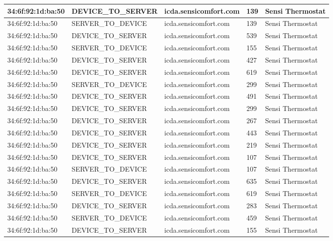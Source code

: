 \begin{table*}[t!]
\begin{tabularx}{\textwidth}{p{3cm} p{4cm} p{4cm} p{2cm} p{2cm}}
34:6f:92:1d:ba:50 &	DEVICE\_TO\_SERVER &	icda.sensicomfort.com &	139	 & Sensi Thermostat \\ \hline
34:6f:92:1d:ba:50 &	SERVER\_TO\_DEVICE &	icda.sensicomfort.com &	139	 & Sensi Thermostat \\ \hline
34:6f:92:1d:ba:50 &	DEVICE\_TO\_SERVER &	icda.sensicomfort.com &	539	 & Sensi Thermostat \\ \hline
34:6f:92:1d:ba:50 &	SERVER\_TO\_DEVICE &	icda.sensicomfort.com &	155	 & Sensi Thermostat \\ \hline
34:6f:92:1d:ba:50 &	DEVICE\_TO\_SERVER &	icda.sensicomfort.com &	427	 & Sensi Thermostat \\ \hline
34:6f:92:1d:ba:50 &	DEVICE\_TO\_SERVER &	icda.sensicomfort.com &	619	 & Sensi Thermostat \\ \hline
34:6f:92:1d:ba:50 &	SERVER\_TO\_DEVICE &	icda.sensicomfort.com &	299	 & Sensi Thermostat \\ \hline
34:6f:92:1d:ba:50 &	DEVICE\_TO\_SERVER &	icda.sensicomfort.com &	491	 & Sensi Thermostat \\ \hline
34:6f:92:1d:ba:50 &	DEVICE\_TO\_SERVER &	icda.sensicomfort.com &	299	 & Sensi Thermostat \\ \hline
34:6f:92:1d:ba:50 &	DEVICE\_TO\_SERVER &	icda.sensicomfort.com &	267	 & Sensi Thermostat \\ \hline
34:6f:92:1d:ba:50 &	DEVICE\_TO\_SERVER &	icda.sensicomfort.com &	443	 & Sensi Thermostat \\ \hline
34:6f:92:1d:ba:50 &	DEVICE\_TO\_SERVER &	icda.sensicomfort.com &	219	 & Sensi Thermostat \\ \hline
34:6f:92:1d:ba:50 &	DEVICE\_TO\_SERVER &	icda.sensicomfort.com &	107	 & Sensi Thermostat \\ \hline
34:6f:92:1d:ba:50 &	SERVER\_TO\_DEVICE &	icda.sensicomfort.com &	107	 & Sensi Thermostat \\ \hline
34:6f:92:1d:ba:50 &	DEVICE\_TO\_SERVER &	icda.sensicomfort.com &	635	 & Sensi Thermostat \\ \hline
34:6f:92:1d:ba:50 &	SERVER\_TO\_DEVICE &	icda.sensicomfort.com &	619	 & Sensi Thermostat \\ \hline
34:6f:92:1d:ba:50 &	DEVICE\_TO\_SERVER &	icda.sensicomfort.com &	283	 & Sensi Thermostat \\ \hline
34:6f:92:1d:ba:50 &	SERVER\_TO\_DEVICE &	icda.sensicomfort.com &	459	 & Sensi Thermostat \\ \hline
34:6f:92:1d:ba:50 &	DEVICE\_TO\_SERVER &	icda.sensicomfort.com &	155	 & Sensi Thermostat \\ \hline

\end{tabularx}
\end{table*}
